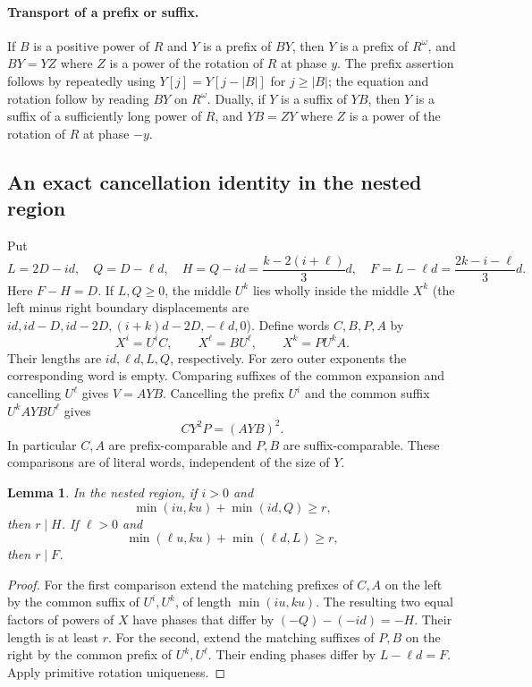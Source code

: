 \documentclass[10pt]{article}
\newtheorem{lemma}[theorem]{Lemma}
\theoremstyle{remark}\newtheorem*{remark}{Remark}
\begin{document}
\paragraph{Transport of a prefix or suffix.}
If $B$ is a positive power of $R$ and $Y$ is a prefix of $BY$, then $Y$
is a prefix of $R^\omega$, and $BY=YZ$ where $Z$ is a power of the
rotation of $R$ at phase $y$. The prefix assertion follows by repeatedly
using $Y[j]=Y[j-|B|]$ for $j\ge |B|$; the equation and rotation follow
by reading $BY$ on $R^\omega$. Dually, if $Y$ is a suffix of $YB$,
then $Y$ is a suffix of a sufficiently long power of $R$, and $YB=ZY$
where $Z$ is a power of the rotation of $R$ at phase $-y$.

\subsection{An exact cancellation identity in the nested region}
Put
\[
 L=2D-id,\quad Q=D-\ell d,\quad
 H=Q-id=\frac{k-2(i+\ell)}3d,\quad
 F=L-\ell d=\frac{2k-i-\ell}3d.
\]
Here $F-H=D$. If $L,Q\ge0$, the middle $U^k$ lies wholly inside the
middle $X^k$ (the left minus right boundary displacements are
$id,id-D,id-2D,(i+k)d-2D,-\ell d,0$). Define words $C,B,P,A$ by
\begin{equation}\label{ph:factor}
 X^i=U^i C,\qquad X^\ell=B U^\ell,\qquad
 X^k=P U^k A.
\end{equation}
Their lengths are $id,\ell d,L,Q$, respectively. For zero outer
exponents the corresponding word is empty. Comparing suffixes of the
common expansion and cancelling $U^\ell$ gives $V=AYB$. Cancelling the
prefix $U^i$ and the common suffix $U^k AYB U^\ell$ gives
\begin{equation}\label{ph:cancel}
 C Y^2 P=(A Y B)^2.
\end{equation}
In particular $C,A$ are prefix-comparable and $P,B$ are suffix-comparable.
These comparisons are of literal words, independent of the size of $Y$.

\begin{lemma}\label{ph:phase}
In the nested region, if $i>0$ and
\[
 \min(iu,ku)+\min(id,Q)\ge r,
\]
then $r\mid H$. If $\ell>0$ and
\[
 \min(\ell u,ku)+\min(\ell d,L)\ge r,
\]
then $r\mid F$.
\end{lemma}
\begin{proof}
For the first comparison extend the matching prefixes of $C,A$ on
the left by the common suffix of $U^i,U^k$, of length $\min(iu,ku)$.
The resulting two equal factors of powers of $X$ have phases that
differ by $(-Q)-(-id)=-H$. Their length is at least $r$. For the
second, extend the matching suffixes of $P,B$ on the right by the
common prefix of $U^k,U^\ell$. Their ending phases differ by $L-\ell
d=F$. Apply primitive rotation uniqueness.
\end{proof}
\end{document}
